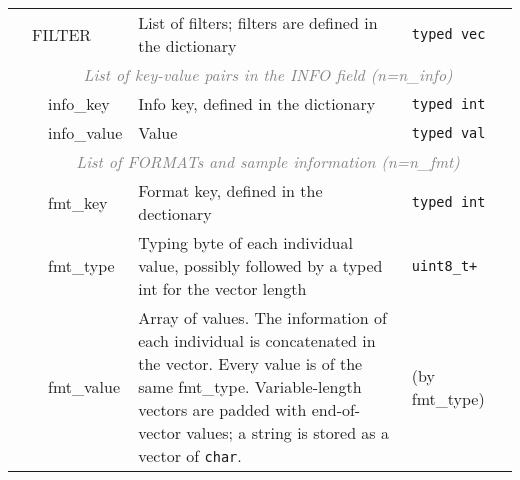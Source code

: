\documentclass[10pt]{article}
\begin{document}
\begin{table}[ht]
{\begin{tabular}{|l|l|l|p{8.2cm}|l|r|}
  & \multicolumn{2}{l|}{\sf FILTER} & List of filters; filters are defined in the dictionary & {\tt typed vec} & \\\cline{2-6}
  & \multicolumn{5}{c|}{\textcolor{gray}{\it List of key-value pairs in the INFO field (n=n\_info)}} \\\cline{3-6}
  & & {\sf info\_key} & Info key, defined in the dictionary & {\tt typed int} & \\\cline{3-6}
  & & {\sf info\_value} & Value & {\tt typed val} &\\\cline{2-6}
  & \multicolumn{5}{c|}{\textcolor{gray}{\it List of FORMATs and sample information (n=n\_fmt)}} \\\cline{3-6}
  & & {\sf fmt\_key} & Format key, defined in the dectionary & {\tt typed int} & \\\cline{3-6}
  & & {\sf fmt\_type} & Typing byte of each individual value, possibly followed by a typed int for the vector length & {\tt uint8\_t+} & \\\cline{3-6}
  & & {\sf fmt\_value} & Array of values. The information of each individual is concatenated in the vector. Every value is of the same {\sf fmt\_type}.
  	Variable-length vectors are padded with end-of-vector values; a string is stored as a vector of {\tt char}. & (by {\sf fmt\_type}) &\\
  \cline{1-6}
\end{tabular}}
\end{table}
\end{document}
